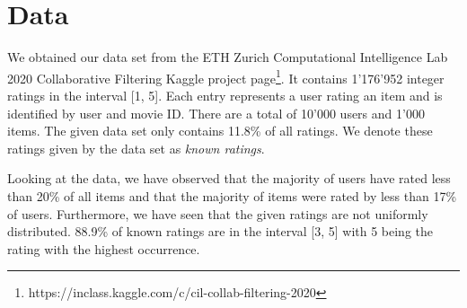 
\section{Data}
We obtained our data set from the ETH Zurich Computational Intelligence Lab 2020 Collaborative Filtering Kaggle project page\footnote{https://inclass.kaggle.com/c/cil-collab-filtering-2020}. It contains 1'176'952 integer ratings in the interval [1, 5]. Each entry represents a user rating an item and is identified by user and movie ID. There are a total of 10'000 users and 1'000 items. The given data set only contains 11.8\% of all ratings. We denote these ratings given by the data set as \textit{known ratings}.

Looking at the data, we have observed that the majority of users have rated less than 20\% of all items and that the majority of items were rated by less than 17\% of users. Furthermore, we have seen that the given ratings are not uniformly distributed. 88.9\% of known ratings are in the interval [3, 5] with 5 being the rating with the highest occurrence.